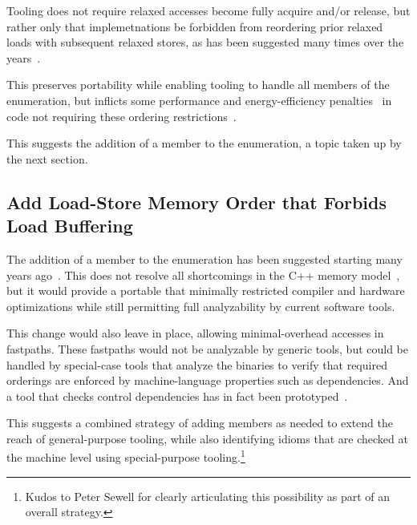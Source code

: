 \documentclass[10]{article}
\begin{document}
Tooling does not require relaxed accesses become fully acquire and/or
release, but rather only that implemetnations be forbidden from reordering
prior relaxed loads with subsequent relaxed stores, as has been suggested
many times over the
years~\cite{Boehm:2014:OGA:2618128.2618134,HansBoehm2019OOTArevisitedAgain,Lahav:2017:RSC:3062341.3062352}.

This preserves portability while enabling tooling to handle all members
of the  enumeration, but inflicts some performance and
energy-efficiency penalties~\cite{LukeGeeson2023TightenRelaxed} in
code not requiring these ordering
restrictions~\cite{PaulEMcKenney2020RelaxedGuideRelaxed}.

This suggests the addition of a  member to
the  enumeration, a topic taken up by the next section.

\subsection{Add Load-Store Memory Order that Forbids Load Buffering}
\label{sec:Add Load-Store Memory Order that Forbids Load Buffering}

The addition of a  member to the
 enumeration has been suggested starting many years
ago~\cite{HansBoehm2019OOTArevisitedAgain,DanielLustig2018PlacedBefore}.
This does not resolve all shortcomings in the C++ memory
model~\cite{PaulEMcKenney2023P0124R8-LKMM,DanielLustig2018PlacedBefore},
but it would provide a portable  that minimally
restricted compiler and hardware optimizations while still permitting
full analyzability by current software tools.

This change would also leave  in place,
allowing minimal-overhead accesses in fastpaths.
These fastpaths would not be analyzable by generic tools, but could
be handled by special-case tools that analyze the binaries to verify
that required orderings are enforced by machine-language properties
such as dependencies.
And a tool that checks control dependencies has in fact been
prototyped~\cite{PaulHeidekrueger2022N4910}.

This suggests a combined strategy of adding  members
as needed to extend the reach of general-purpose tooling, while also
identifying  idioms that are checked at the
machine level using special-purpose tooling.\footnote{
	Kudos to Peter Sewell for clearly articulating this possibility
	as part of an overall strategy.}
\end{document}
